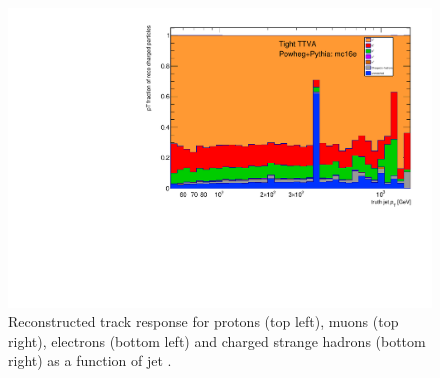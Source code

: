 \begin{figure}[tbh]
\includegraphics[scale=0.3, page=9]{figures/jet_comp_study_powheg_Tight_pTFraction_mc16e.pdf}
\caption {Reconstructed track response for protons (top left), muons (top right), electrons (bottom left) and charged strange hadrons (bottom right) as a function of jet \pT.}
\label{fig:r_other}
\end{figure}









